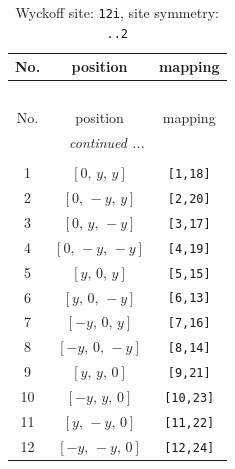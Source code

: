 \documentclass[fleqn,8pt]{jsarticle}
\begin{document}
\begin{longtable}{ccc}
\caption{Wyckoff site: {\tt 12i}, site symmetry: {\tt ..2}}
 \\
 \hline \hline
No. & position & mapping \\ \hline \endfirsthead

\multicolumn{2}{l}{\tablename\ \thetable{}} \\
 \hline \hline
No. & position & mapping \\ \hline \endhead

 \hline \hline
\multicolumn{2}{r}{\footnotesize\it continued ...} \\ \endfoot

 \hline \hline
\multicolumn{2}{r}{} \\ \endlastfoot

1 & $\left[ 0,\, y,\, y \right]$ & {\tt [1,18]} \\ \hline
2 & $\left[ 0,\, - y,\, y \right]$ & {\tt [2,20]} \\ \hline
3 & $\left[ 0,\, y,\, - y \right]$ & {\tt [3,17]} \\ \hline
4 & $\left[ 0,\, - y,\, - y \right]$ & {\tt [4,19]} \\ \hline
5 & $\left[ y,\, 0,\, y \right]$ & {\tt [5,15]} \\ \hline
6 & $\left[ y,\, 0,\, - y \right]$ & {\tt [6,13]} \\ \hline
7 & $\left[ - y,\, 0,\, y \right]$ & {\tt [7,16]} \\ \hline
8 & $\left[ - y,\, 0,\, - y \right]$ & {\tt [8,14]} \\ \hline
9 & $\left[ y,\, y,\, 0 \right]$ & {\tt [9,21]} \\ \hline
10 & $\left[ - y,\, y,\, 0 \right]$ & {\tt [10,23]} \\ \hline
11 & $\left[ y,\, - y,\, 0 \right]$ & {\tt [11,22]} \\ \hline
12 & $\left[ - y,\, - y,\, 0 \right]$ & {\tt [12,24]} \\
\end{longtable}
\renewcommand{\arraystretch}{1.2}
\end{document}
